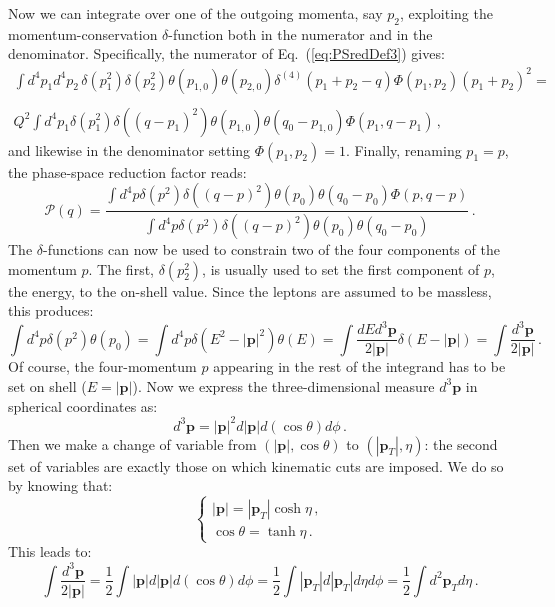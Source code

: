\documentclass[10pt,a4paper]{article}
\begin{document}
Now we can integrate over one of the outgoing momenta, say $p_2$,
exploiting the momentum-conservation $\delta$-function both in the
numerator and in the denominator. Specifically, the numerator of
Eq.~(\ref{eq:PSredDef3}) gives:
\begin{equation}
\begin{array}{c}
\displaystyle \int d^4p_1 d^4p_2\, \delta(p_1^2)
\delta(p_2^2) \theta(p_{1,0}) \theta(p_{2,0})\delta^{(4)}(p_1+p_2-q)
  \Phi(p_1,p_2) (p_1+p_2)^2 = \\
\\
\displaystyle Q^2 \int d^4p_1 \delta(p_1^2)
\delta((q-p_1)^2) \theta(p_{1,0})
  \theta(q_0-p_{1,0})\Phi(p_1,q-p_1)\,,
\end{array}
\end{equation}
and likewise in the denominator setting $\Phi(p_1,p_2)=1$. Finally,
renaming $p_1=p$, the phase-space reduction factor reads:
\begin{equation}\label{eq:PSredDef4}
  \mathcal{P}(q) = \frac{\displaystyle \int d^4p \delta(p^2) \delta((q-p)^2) \theta(p_{0})
    \theta(q_0-p_{0})  \Phi(p,q-p)}{\displaystyle \int d^4p \delta(p^2) \delta((q-p)^2) \theta(p_{0})
    \theta(q_0-p_{0})  }\,.
\end{equation}
The $\delta$-functions can now be used to constrain two of the four
components of the momentum $p$. The first, $\delta(p_2^2)$, is usually
used to set the first component of $p$, the energy, to the on-shell
value. Since the leptons are assumed to be massless, this
produces:
\begin{equation}\label{eq:phasespacemeasure}
\int d^4p\delta(p^2)\theta(p_0) = \int d^4p\delta(E^2-|\mathbf{p}|^2)\theta(E)=\int\frac{dEd^3\mathbf{p}}{2|\mathbf{p}|}\delta(E-|\mathbf{p}|)=\int\frac{d^3\mathbf{p}}{2|\mathbf{p}|}\,.
\end{equation}
Of course, the four-momentum $p$ appearing in the rest of the
integrand has to be set on shell ($E=|\mathbf{p}|$). Now we express
the three-dimensional measure $d^3\mathbf{p}$ in spherical coordinates
as:
\begin{equation}
d^3\mathbf{p} = |\mathbf{p}|^2d|\mathbf{p}|d(\cos\theta) d\phi\,.
\end{equation}
Then we make a change of variable from $(|\mathbf{p}|,\cos\theta)$ to
$(|\mathbf{p}_T|,\eta)$: the second set of variables are exactly those
on which kinematic cuts are imposed. We do so by knowing that:
\begin{equation}
\left\{
\begin{array}{l}
|\mathbf{p}| = |\mathbf{p}_T|\cosh\eta\,,\\
\cos\theta =\tanh\eta\,.
\end{array}
\right.
\end{equation}
This leads to:
\begin{equation}
\int\frac{d^3\mathbf{p}}{2 |\mathbf{p}|} = \frac12\int|\mathbf{p}|d|\mathbf{p}|d(\cos\theta) d\phi=\frac12\int|\mathbf{p}_T|d|\mathbf{p}_T|d\eta d\phi=\frac12\int d^2\mathbf{p}_T d\eta\,.
\end{equation}
\end{document}
